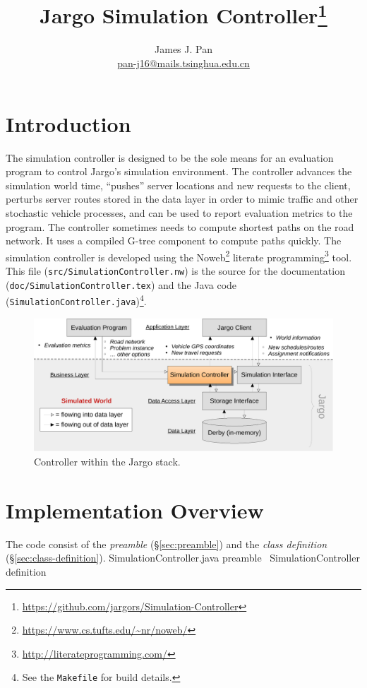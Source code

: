 \documentclass{article}
\title{Jargo Simulation Controller\footnote{
  \url{https://github.com/jargors/Simulation-Controller}}}
\author{James J. Pan\\
  \small{\href{mailto:pan-j16@mails.tsinghua.edu.cn}{pan-j16@mails.tsinghua.edu.cn}}}
\def\nwendcode{\endtrivlist \endgroup}      %
\let\nwdocspar=\par
\begin{document}
\maketitle
\pagestyle{noweb}

\tableofcontents

\section{Introduction}
\label{sec:introduction}
The simulation controller is designed to be the sole means for an evaluation
program to control Jargo's simulation environment. The controller advances the
simulation world time, ``pushes'' server locations and new requests to the
client, perturbs server routes stored in the data layer in order to mimic
traffic and other stochastic vehicle processes, and can be used to report
evaluation metrics to the program. The controller sometimes needs to compute
shortest paths on the road network. It uses a compiled G-tree component to
compute paths quickly. The simulation controller is developed
using the Noweb\footnote{\url{https://www.cs.tufts.edu/~nr/noweb/}} literate
programming\footnote{\url{http://literateprogramming.com/}} tool.  This file
({\tt{}src/SimulationController.nw}) is the source for the documentation
({\tt{}doc/SimulationController.tex}) and the Java code
({\tt{}SimulationController.java})\footnote{See the {\tt{}Makefile} for build
details.}.

\begin{figure}[h]
\centering
\includegraphics[width=150mm]{src/fig/controller-fig}
\caption{Controller within the Jargo stack.}
\label{fig:controller}
\end{figure}

\section{Implementation Overview}
The code consist of the \emph{preamble} (\S\ref{sec:preamble})
and the \emph{class definition} (\S\ref{sec:class-definition}).
\endmoddef{}
  \LA{}SimulationController.java preamble~{\nwtagstyle{}}\RA{}
  \LA{}\code{}SimulationController\edoc{} definition~{\nwtagstyle{}}\RA{}
\nwendcode{}\nwdocspar
\end{document}
